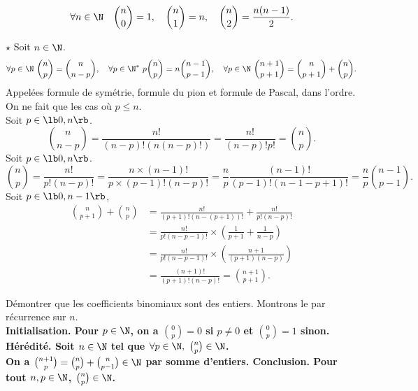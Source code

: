 \documentclass[11pt]{article}
\begin{document}
\begin{ex}{}{}
    \begin{equation*}
        \forall n\in\N\quad\binom{n}{0}=1,\quad\binom{n}{1}=n,\quad\binom{n}{2}=\frac{n(n-1)}{2}.
    \end{equation*}
\end{ex}

\begin{prop}{$\star$}{}
    Soit $n\in\N$.
    \begin{equation*}
        \forall p\in\N~\binom{n}{p}=\binom{n}{n-p},\quad\forall p\in\N^*~p\binom{n}{p}=n\binom{n-1}{p-1},\quad\forall p\in\N~\binom{n+1}{p+1}=\binom{n}{p+1}+\binom{n}{p}.
    \end{equation*}
    Appelées formule de symétrie, formule du pion et formule de Pascal, dans l'ordre.
    \tcblower
    On ne fait que les cas où $p\leq n$.\\
     Soit $p\in\lb0,n\rb$.
    \begin{equation*}
        \binom{n}{n-p}=\frac{n!}{(n-p)!(n(n-p)!)}=\frac{n!}{(n-p)!p!}=\binom{n}{p}.
    \end{equation*}
     Soit $p\in\lb0,n\rb$.
    \begin{equation*}
        \binom{n}{p}=\frac{n!}{p!(n-p)!}=\frac{n\times(n-1)!}{p\times(p-1)!(n-p)!}=\frac{n}{p}\frac{(n-1)!}{(p-1)!(n-1-p+1)!}=\frac{n}{p}\binom{n-1}{p-1}.
    \end{equation*}
     Soit $p\in\lb0,n-1\rb$,
    \begin{align*}
        \binom{n}{p+1}+\binom{n}{p}&=\frac{n!}{(p+1)!(n-(p+1))!}+\frac{n!}{p!(n-p)!}\\
        &=\frac{n!}{p!(n-p-1)!}\times\left( \frac{1}{p+1} + \frac{1}{n-p} \right)\\
        &=\frac{n!}{p!(n-p-1)!}\times\left( \frac{n+1}{(p+1)(n-p)} \right)\\
        &=\frac{(n+1)!}{(p+1)!(n-p)!}=\binom{n+1}{p+1}.
    \end{align*}
\end{prop}

\begin{ex}{}{}
    Démontrer que les coefficients binomiaux sont des entiers.
    \tcblower
    Montrons le par récurrence sur $n$.\\
    \bf{Initialisation.} Pour $p\in\N$, on a $\binom{0}{p}=0$ si $p\neq 0$ et $\binom{0}{p}=1$ sinon.\\
    \bf{Hérédité.} Soit $n\in\N$ tel que $\forall p \in \N, ~ \binom{n}{p}\in\N$.\\
    On a $\binom{n+1}{p}=\binom{n}{p}+\binom{n}{p-1}\in\N$ par somme d'entiers.
    \bf{Conclusion.} Pour tout $n,p\in\N$, $\binom{n}{p}\in\N$.
\end{ex}
\end{document}
